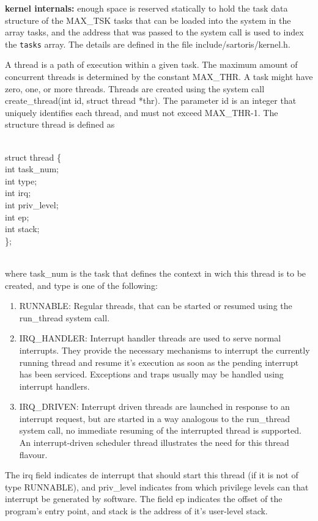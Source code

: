 \documentclass[11pt, letterpaper, twoside, english]{book}
\begin{document}
\textbf{kernel internals:} enough space is reserved statically to hold the \textsf{task} data structure of the \textsf{MAX\_TSK} tasks that can be loaded into the system in the array \textsf{tasks}, and the \textsf{address} that was passed to the system call is used to index the \verb|tasks| array. The details are defined in the file \textsf{include/sartoris/kernel.h}.

A thread is a path of execution within a given task. The maximum amount of concurrent threads is determined by the constant \textsf{MAX\_THR}. A task might have zero, one, or more threads. Threads are created using the system call \textsf{create\_thread(int id, struct thread *thr)}. The parameter \textsf{id} is an integer that uniquely identifies each thread, and must not exceed \textsf{MAX\_THR}-1. The structure \textsf{thread} is defined as \\
\\
\begin{sf} \noindent struct thread \{ \\
\indent  int task\_num; \\
\indent  int type; \\
\indent  int irq; \\
\indent  int priv\_level; \\
\indent  int ep; \\
\indent  int stack; \\
\}; \\
\end{sf}
\\
where \textsf{task\_num} is the task that defines the context in wich this thread is to be created, and type is one of the following:
\begin{enumerate}
\item[] \textsf{RUNNABLE}: Regular threads, that can be started or resumed using the \textsf{run\_thread} system call.
\item[] \textsf{IRQ\_HANDLER}: Interrupt handler threads are used to serve normal interrupts. They provide the necessary mechanisms to interrupt the currently running thread and resume it's execution as soon as the pending interrupt has been serviced. Exceptions and traps usually may be handled using interrupt handlers.
\item[] \textsf{IRQ\_DRIVEN}: Interrupt driven threads are launched in response to an interrupt request, but are started in a way analogous to the \textsf{run\_thread} system call, no immediate resuming of the interrupted thread is supported. An interrupt-driven scheduler thread illustrates the need for this thread flavour.
\end{enumerate}
The \textsf{irq} field indicates de interrupt that should start this thread (if it is not of type \textsf{RUNNABLE}), and \textsf{priv\_level} indicates from which privilege levels can that interrupt be generated by software. The field \textsf{ep} indicates the offset of the program's entry point, and \textsf{stack} is the address of it's user-level stack.
\end{document}

